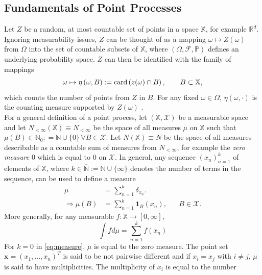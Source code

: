 \subsection{Fundamentals of Point Processes}
Let $Z$ be a random, at most countable set of points in a space $\mathbb{X}$, for example $\mathbb{R}^d$. Ignoring measurability issues, $Z$ can be thought of as a mapping $\omega\mapsto Z\left(\omega\right)$ from $\Omega$ into the set of countable subsets of $\mathbb{X}$, where $\left(\Omega, \mathcal{F}, \mathbb{P}\right)$ defines an underlying probability space. $Z$ can then be identified with the family of mappings
\begin{equation}
    \omega\mapsto\eta\left(\omega, B\right):=\hbox{card}\left(z(\omega)\cap B\right), \hspace{20pt}B\subset\mathbb{X},
\end{equation}
which counts the number of points from $Z$ in $B$. For any fixed $\omega\in\Omega$, $\eta\left(\omega,\cdot\right)$ is the counting measure supported by $Z\left(\omega\right)$ \autocite[][]{cox1980point}. \\
For a general definition of a point process, let $\left(\mathbb{X}, \mathcal{X}\right)$ be a measurable space and let $N_{<\infty}\left(\mathbb{X}\right)\equiv N_{<\infty}$ be the space of all measures $\mu$ on $\mathbb{X}$ such that $\mu(B)\in\mathbb{N}_0: =\mathbb{N}\cup\lbrace0\rbrace\,\forall B\in\mathcal{X}$. Let $N\left(\mathbb{X}\right)\equiv N$ be the space of all measures describable as a countable sum of measures from $N_{<\infty}$, for example the \textit{zero measure} 0 which is equal to $0$ on $\mathcal{X}$. In general, any sequence $\left(x_n\right)_{n=1}^k$ of elements of $\mathbb{X}$, where $k\in\overline{\mathbb{N}}:=\mathbb{N}\cup\lbrace\infty\rbrace$ denotes the number of terms in the sequence, can be used to define a measure
\begin{align}
    \mu&=\sum_{n=1}^k\delta_{x_n}. \label{eq:measure} \\
    \Rightarrow\mu\left(B\right)&=\sum_{n=1}^k\pmb{1}_B\left(x_n\right),\hspace{20pt} B\in\mathcal{X}. \nonumber
\end{align}
More generally, for any measurable $f:\mathbb{X}\rightarrow\left[0,\infty\right]$,
\begin{equation}
    \int fd\mu=\sum_{n=1}^kf\left(x_n\right)
\end{equation}
For $k=0$ in \eqref{eq:measure}, $\mu$ is equal to the zero measure. The point set $\pmb{x}=\left(x_1,...,x_n\right)^T$ is said to be not pairwise different and if $x_i=x_j$ with $i\neq j$, $\mu$ is said to have multiplicities. The multiplicity of $x_i$ is equal to the number
